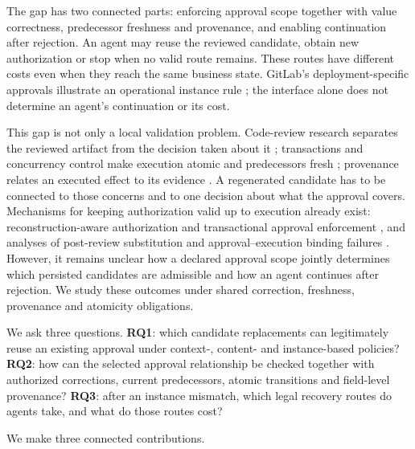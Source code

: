 \documentclass[pdflatex,sn-basic]{sn-jnl}
\begin{document}
The gap has two connected parts: enforcing approval scope together with value correctness, predecessor freshness and provenance, and enabling continuation after rejection. An agent may reuse the reviewed candidate, obtain new authorization or stop when no valid route remains. These routes have different costs even when they reach the same business state. GitLab's deployment-specific approvals illustrate an operational instance rule \citep{gitlab-deployment-approval}; the interface alone does not determine an agent's continuation or its cost.

This gap is not only a local validation problem. Code-review research separates the reviewed artifact from the decision taken about it \citep{bacchelli2013review}; transactions and concurrency control make execution atomic and predecessors fresh \citep{gray-transaction,kung-occ}; provenance relates an executed effect to its evidence \citep{buneman-provenance}. A regenerated candidate has to be connected to those concerns and to one decision about what the approval covers. Mechanisms for keeping authorization valid up to execution already exist: reconstruction-aware authorization and transactional approval enforcement \citep{zhu2026resa,bindschaedler2026guarded}, and analyses of post-review substitution and approval--execution binding failures \citep{kumar2026loopjacking,wang2026approval}. However, it remains unclear how a declared approval scope jointly determines which persisted candidates are admissible and how an agent continues after rejection. We study these outcomes under shared correction, freshness, provenance and atomicity obligations.

We ask three questions. \textbf{RQ1}: which candidate replacements can legitimately reuse an existing approval under context-, content- and instance-based policies? \textbf{RQ2}: how can the selected approval relationship be checked together with authorized corrections, current predecessors, atomic transitions and field-level provenance? \textbf{RQ3}: after an instance mismatch, which legal recovery routes do agents take, and what do those routes cost?

We make three connected contributions.
\end{document}

